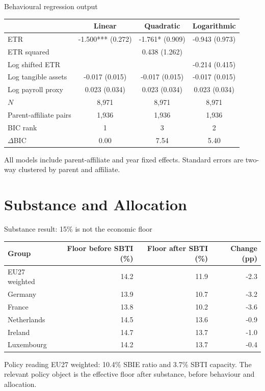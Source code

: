 \documentclass[aspectratio=169, 11pt]{beamer}
\newcommand{\sourceline}[1]{}
\begin{document}
\begin{frame}{Behavioural regression output}
\small
\begin{center}
\scriptsize
\begin{tabular}{@{}lccc@{}}
  \toprule
  & Linear & Quadratic & Logarithmic \\
  \midrule
  ETR & -1.500*** (0.272) & -1.761* (0.909) & -0.943 (0.973) \\
  ETR squared & & 0.438 (1.262) & \\
  Log shifted ETR & & & -0.214 (0.415) \\
  Log tangible assets & -0.017 (0.015) & -0.017 (0.015) & -0.017 (0.015) \\
  Log payroll proxy & 0.023 (0.034) & 0.023 (0.034) & 0.023 (0.034) \\
  \midrule
  $N$ & 8,971 & 8,971 & 8,971 \\
  Parent-affiliate pairs & 1,936 & 1,936 & 1,936 \\
  BIC rank & 1 & 3 & 2 \\
  $\Delta$BIC & 0.00 & 7.54 & 5.40 \\
  \bottomrule
\end{tabular}
\end{center}
\tiny All models include parent-affiliate and year fixed effects. Standard errors are two-way clustered by parent and affiliate.
\sourceline{generated Table stage3\_regression\_table}
\end{frame}

\section{Substance and Allocation}

\begin{frame}{Substance result: 15\% is not the economic floor}
\small
\begin{center}
\scriptsize
\setlength{\tabcolsep}{7pt}
\begin{tabular}{@{}lrrr@{}}
  \toprule
  Group & Floor before SBTI (\%) & Floor after SBTI (\%) & Change (pp) \\
  \midrule
  EU27 weighted & 14.2 & 11.9 & -2.3 \\
  Germany & 13.9 & 10.7 & -3.2 \\
  France & 13.8 & 10.2 & -3.6 \\
  Netherlands & 14.5 & 13.6 & -0.9 \\
  Ireland & 14.7 & 13.7 & -1.0 \\
  Luxembourg & 14.2 & 13.7 & -0.4 \\
  \bottomrule
\end{tabular}
\end{center}

\vspace{0.45em}
\begin{block}{Policy reading}
  EU27 weighted: 10.4\% SBIE ratio and 3.7\% SBTI capacity. The relevant policy object is the effective floor after substance, before behaviour and allocation.
\end{block}
\end{frame}
\end{document}
